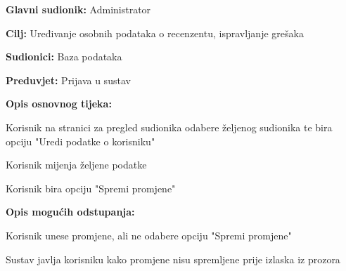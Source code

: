 					\noindent {}
					\begin{packed_item}
						\item \textbf{Glavni sudionik:} Administrator
						\item \textbf{Cilj:} Uređivanje osobnih podataka o recenzentu, ispravljanje grešaka
						\item \textbf{Sudionici:} Baza podataka
						\item \textbf{Preduvjet:} Prijava u sustav
						
						\item \textbf{Opis osnovnog tijeka:} 
						\item[] \begin{packed_enum}
							\item Korisnik na stranici za pregled sudionika odabere željenog sudionika te bira opciju "Uredi podatke o korisniku"
							\item Korisnik mijenja željene podatke
							\item Korisnik bira opciju "Spremi promjene"
						\end{packed_enum}
					
						\item \textbf{Opis mogućih odstupanja:}
						\item[] \begin{packed_enum}

							\item[2.a] Korisnik unese promjene, ali ne odabere opciju "Spremi promjene"
							\item[] \begin{packed_enum}
								\item[1.] Sustav javlja korisniku kako promjene nisu spremljene prije izlaska iz prozora
							\end{packed_enum}
						\end{packed_enum}
					\end{packed_item}

